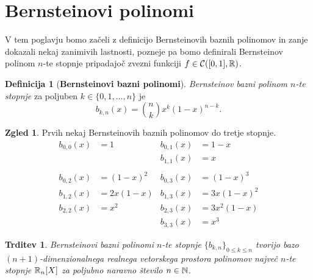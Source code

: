 \documentclass[a4paper, reqno]{amsart}
\theoremstyle{theorem}
\newtheorem{trditev}[izrek]{Trditev}
\theoremstyle{definition}
\newtheorem{definicija}{Definicija}[section]
\newtheorem*{zgled*}{Zgled}
\begin{document}

\section{Bernsteinovi polinomi}

V tem poglavju bomo začeli z definicijo Bernsteinovih baznih polinomov in zanje
dokazali nekaj zanimivih lastnosti, pozneje pa bomo definirali Bernsteinov polinom
$n$-te stopnje pripadajoč zvezni funkciji $f \in \mathcal{C}([0,1],\mathbb{R})$.

\begin{definicija}[\textbf{Bernsteinovi bazni polinomi}]
	\label{B-bazni}
	\emph{Bernsteinov bazni polinom $n$-te stopnje} za poljuben $k \in \{0,1,\dots,n\}$ 
	je
	$$ b_{k, n}(x) = \binom nk x^k(1 - x)^{n - k}\text{.}$$
\end{definicija}
	
\begin{zgled*}
	Prvih nekaj Bernsteinovih baznih polinomov do tretje stopnje.
	\begin{align*}
		b_{0,0}(x) &= 1          & b_{0,1}(x) &= 1 - x       \\
							 &             & b_{1,1}(x) &= x  		     \\
							 &  					 & 					  &              \\
	  b_{0,2}(x) &= (1 - x)^2  & b_{0,3}(x) &= (1 - x)^3   \\
		b_{1,2}(x) &= 2x(1 - x)  & b_{1,3}(x) &= 3x(1 - x)^2 \\
		b_{2,2}(x) &= x^2        & b_{2,3}(x) &= 3x^2(1 - x) \\
							 &             & b_{3,3}(x) &= x^3   
	\end{align*}
\end{zgled*}

\begin{trditev}
	Bernsteinovi bazni polinomi $n$-te stopnje $\{b_{k,n}\}_{0 \leq k \leq n}$
	tvorijo bazo $(n+1)$-dimenzionalnega realnega vetorskega prostora polinomov 
	največ $n$-te stopnje $\mathbb{R}_n[X]$ za poljubno naravno število $n \in \mathbb{N}$.
\end{trditev}
\end{document}
